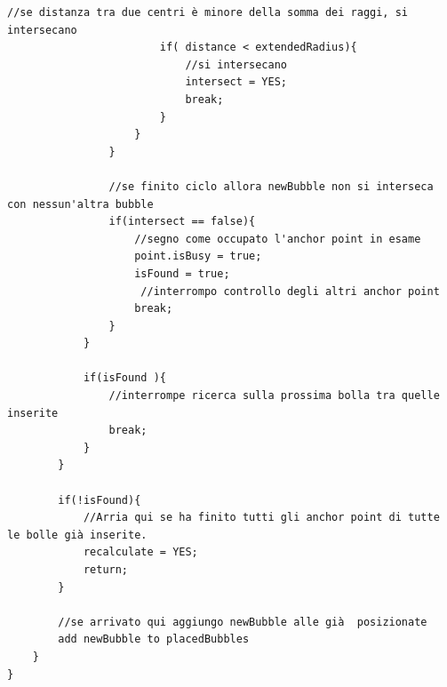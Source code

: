 \begin{lstlisting}[label=algo:3,caption=calculateOriginForBubble,breaklines=true,  commentstyle=\color{CadetBlue}]
                        //se distanza tra due centri è minore della somma dei raggi, si intersecano
                        if( distance < extendedRadius){
                            //si intersecano
                            intersect = YES;
                            break;
                        }
                    }
                }
                
                //se finito ciclo allora newBubble non si interseca con nessun'altra bubble
                if(intersect == false){
                    //segno come occupato l'anchor point in esame
                    point.isBusy = true;
                    isFound = true;
                     //interrompo controllo degli altri anchor point
                    break;
                }
            }

            if(isFound ){
                //interrompe ricerca sulla prossima bolla tra quelle inserite
                break;
            }
        }

        if(!isFound){
            //Arria qui se ha finito tutti gli anchor point di tutte le bolle già inserite.
            recalculate = YES;
            return;
        }

        //se arrivato qui aggiungo newBubble alle già  posizionate
        add newBubble to placedBubbles
    }
}
\end{lstlisting}
